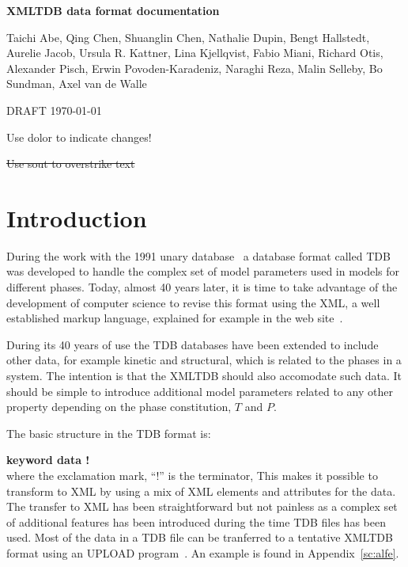 \documentclass[12pt]{article}
\begin{document}
\begin{center}

  {\Large \bf XMLTDB data format documentation}

  \bigskip
  Taichi Abe, Qing Chen, Shuanglin Chen, Nathalie Dupin, Bengt
  Hallstedt, Aurelie Jacob, Ursula R. Kattner, Lina Kjellqvist, Fabio
  Miani, Richard Otis, Alexander Pisch, Erwin Povoden-Karadeniz, Naraghi
  Reza, Malin Selleby, Bo Sundman, Axel van de Walle

  DRAFT \today

\end{center}

{\color{magenta} Use dolor to indicate changes!}

\sout{Use sout to overstrike text}


\section{Introduction}

During the work with the 1991 unary database~\cite{91Din} a database
format called TDB was developed to handle the complex set of model
parameters used in models for different phases.  Today, almost 40
years later, it is time to take advantage of the development of
computer science to revise this format using the XML, a well
established markup language, explained for example in the web
site~\cite{XML}.

During its 40 years of use the TDB databases have been extended to
include other data, for example kinetic and structural, which is
related to the phases in a system.  The intention is that the XMLTDB
should also accomodate such data.  It should be simple to introduce
additional model parameters related to any other property depending on
the phase constitution, $T$ and $P$.

\bigskip
The basic structure in the TDB format is:

{\bf keyword data !}\\

\noindent
where the exclamation mark, ``!'' is the terminator, This makes it
possible to transform to XML by using a mix of XML elements and
attributes for the data.  The transfer to XML has been straightforward
but not painless as a complex set of additional features has been
introduced during the time TDB files has been used.  Most of the data
in a TDB file can be tranferred to a tentative XMLTDB format using an
UPLOAD program~\cite{upload}.  An example is found in
Appendix~\ref{sc:alfe}.
\end{document}
